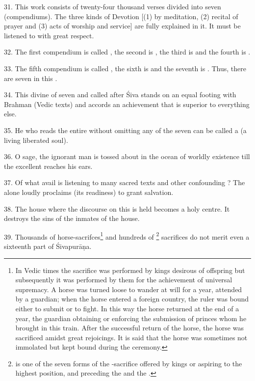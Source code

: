 31. This work consists of twenty-four thousand verses divided into seven
 (compendiums). The three kinds of Devotion [(1) by meditation,
(2) recital of prayer and (3) acts of worship and service] are fully explained
in it. It must be listened to with great respect.

32. The first compendium is called , the second is
, the third is  and the fourth is
.

33. The fifth compendium is called , the sixth is
 and the seventh is . Thus, there are seven
 in this .

34. This divine  of seven  and called after Śiva stands
on an equal footing with Brahman (\ie Vedic texts) and accords an achievement
that is superior to everything else.

35. He who reads the entire  without omitting any of the seven
 can be called a  (a living liberated soul).

36. O sage, the ignorant man is tossed about in the ocean of worldly existence
till the excellent  reaches his ears.

37. Of what avail is listening to many sacred texts and other confounding
? The  alone loudly proclaims (its readiness) to
grant salvation.

38. The house where the discourse on this  is held becomes a holy
centre. It destroys the sins of the inmates of the house.

39. Thousands of horse-sacrifces\footnote{In Vedic times the 
sacrifice was performed by kings desirous of offspring but subsequently it was
performed by them for the achievement of universal supremacy. A horse was turned
loose to wander at will for a year, attended by a guardian; when the horse
entered a foreign country, the ruler was bound either to submit or to fight. In
this way the horse returned at the end of a year, the guardian obtaining or
enforcing the submission of princes whom he brought in this train. After the
successful return of the horse, the horse was sacrificed amidst great rejoicings.
It is said that the horse was sometimes not immolated but kept bound during the
ceremony.} and hundreds of \footnote{ is one of the
seven forms of the -sacrifice offered by kings or 
aspiring to the highest position, and preceding the  and the
.} sacrifices do not merit even a sixteenth part of Śivapurāṇa.

